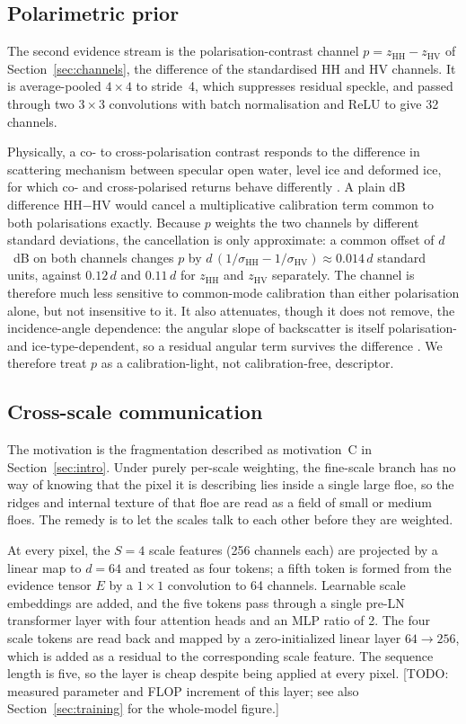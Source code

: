 \documentclass[preprint,12pt,authoryear]{elsarticle}
\begin{document}
\subsection{Polarimetric prior}
\label{sec:polar}

The second evidence stream is the polarisation-contrast channel
$p = z_{\mathrm{HH}} - z_{\mathrm{HV}}$ of Section~\ref{sec:channels}, the
difference of the standardised HH and HV channels. It is average-pooled
$4\times4$ to stride~4, which suppresses residual speckle, and passed through
two $3\times3$ convolutions with batch normalisation and ReLU to give 32
channels.

Physically, a co- to cross-polarisation contrast responds to the difference
in scattering mechanism between specular open water, level ice and deformed
ice, for which co- and cross-polarised returns behave differently
\citep{geldsetzer2009seaice, shokr2023polarimetric}. A plain dB difference
HH$-$HV would cancel a multiplicative calibration term common to both
polarisations exactly. Because $p$ weights the two channels by different
standard deviations, the cancellation is only approximate: a common offset of
$d$~dB on both channels changes $p$ by
$d\,(1/\sigma_{\mathrm{HH}} - 1/\sigma_{\mathrm{HV}}) \approx 0.014\,d$
standard units, against $0.12\,d$ and $0.11\,d$ for $z_{\mathrm{HH}}$ and
$z_{\mathrm{HV}}$ separately. The channel is therefore much less sensitive to
common-mode calibration than either polarisation alone, but not insensitive to
it. It also attenuates, though it does not remove, the incidence-angle
dependence: the angular slope of backscatter is itself polarisation- and
ice-type-dependent, so a residual angular term survives the difference
\citep{aldenhoff2020incidence}. We therefore treat $p$ as a
calibration-light, not calibration-free, descriptor.

\subsection{Cross-scale communication}
\label{sec:xscale}

The motivation is the fragmentation described as motivation~C in
Section~\ref{sec:intro}. Under purely per-scale weighting, the fine-scale branch
has no way of knowing that the pixel it is describing lies inside a single large
floe, so the ridges and internal texture of that floe are read as a field of
small or medium floes. The remedy is to let the scales talk to each other before
they are weighted.

At every pixel, the $S=4$ scale features (256 channels each) are projected by a
linear map to $d=64$ and treated as four tokens; a fifth token is formed from
the evidence tensor $E$ by a $1\times1$ convolution to 64 channels. Learnable
scale embeddings are added, and the five tokens pass through a single pre-LN
transformer layer with four attention heads and an MLP ratio of 2. The four
scale tokens are read back and mapped by a zero-initialized linear layer
$64 \to 256$, which is added as a residual to the corresponding scale feature.
The sequence length is five, so the layer is cheap despite being applied at
every pixel. [TODO: measured parameter and FLOP increment of this layer; see
also Section~\ref{sec:training} for the whole-model figure.]
\end{document}
